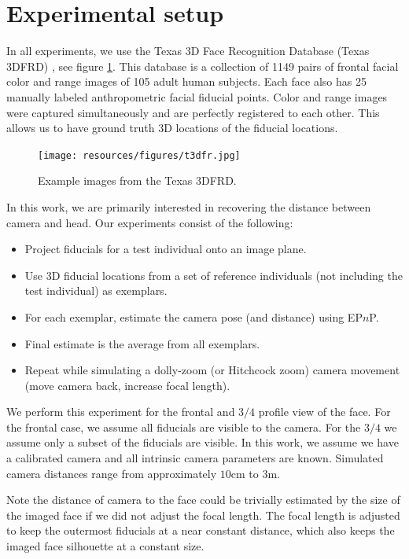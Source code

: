 \documentclass[runningheads]{llncs}
\newcommand {\EPnP} {EP$n$P}
\begin{document}
\section{Experimental setup} \label{sec:experiments}
In all experiments, we use the Texas 3D Face Recognition Database (Texas 3DFRD) \cite{gupta2010texas}, see figure \ref{fig:t3dfrd}.  
This database is a collection of 1149 pairs of frontal facial color and range images of 105 adult human subjects.  
Each face also has 25 manually labeled anthropometric facial fiducial points.  
Color and range images were captured simultaneously and are perfectly registered to each other.  
This allows us to have ground truth 3D locations of the fiducial locations.  
\begin{figure}[h]
\centering
\texttt{[image: resources/figures/t3dfr.jpg]}
\caption{Example images from the Texas 3DFRD.}
\label{fig:t3dfrd}
\end{figure}
In this work, we are primarily interested in recovering the distance between camera and head.  Our experiments consist of the following:

\begin{itemize}
\item Project fiducials for a test individual onto an image plane.
\item Use 3D fiducial locations from a set of reference individuals (not including the test individual) as exemplars.
\item For each exemplar, estimate the camera pose (and distance) using \EPnP.
\item Final estimate is the average from all exemplars.
\item Repeat while simulating a dolly-zoom (or Hitchcock zoom) camera movement (move camera back, increase focal length).  
\end{itemize}

We perform this experiment for the frontal and $3/4$ profile view of the face.  
For the frontal case, we assume all fiducials are visible to the camera.  
For the $3/4$ we assume only a subset of the fiducials are visible. 
In this work, we assume we have a calibrated camera and all intrinsic camera parameters are known.  
Simulated camera distances range from approximately $10$cm to $3$m.

Note the distance of camera to the face could be trivially estimated by the size of the imaged face if we did not adjust the focal length. 
The focal length is adjusted to keep the outermost fiducials at a near constant distance, which also keeps the imaged face silhouette at a constant size.
\end{document}
